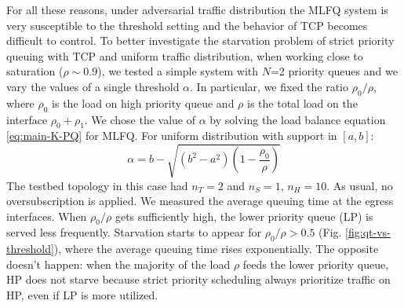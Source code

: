 For all these reasons, under adversarial traffic distribution the MLFQ system is very susceptible to the threshold setting and the behavior of TCP becomes difficult to control.
To better investigate the starvation problem of strict priority queuing with TCP and uniform traffic distribution, when working close to saturation ($\rho \sim 0.9$), we tested a simple system with $N$=2 priority queues and we vary the values of a single threshold $\alpha$. 
In particular, we fixed the ratio $\rho_{0} / \rho$, where $\rho_0$ is the load on high priority queue and $\rho$ is the total load on the interface $\rho_{0} + \rho_{1}$. We chose the value of $\alpha$ by solving the load balance equation \eqref{eq:main-K-PQ} for MLFQ. For uniform distribution with support in $[a,b]$:
\begin{equation*}
\alpha = b - \sqrt{(b^2 - a^2)(1-\dfrac{\rho_{0}}{  \rho})}
\end{equation*}
The testbed topology in this case had $n_T=2$ and $n_S=1$, $n_H=10$. As usual, no oversubscription is applied. We measured the average queuing time at the egress interfaces. %
When $\rho_{0} / \rho$ gets sufficiently high, the lower priority queue (LP) is served less frequently.  Starvation starts to appear for $\rho_0 / \rho > 0.5$ (Fig. \ref{fig:qt-vs-threshold}), where the average queuing time rises exponentially. The opposite doesn't happen: when the majority of the load $\rho$ feeds the lower priority queue, HP does not starve because strict priority scheduling always prioritize traffic on HP, even if LP is more utilized. 
